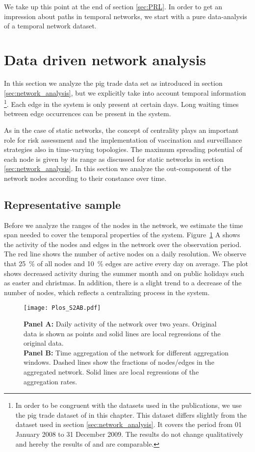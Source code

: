 We take up this point at the end of section \ref{sec:PRL}.
In order to get an impression about paths in temporal networks, we start with a pure data-analysis of a temporal network dataset. 



\section{Data driven network analysis}\label{sec:Plos}
In this section we analyze the pig trade data set as introduced in section \ref{sec:network_analysis}, but we explicitly take into account temporal information%
\footnote{%
In order to be congruent with the datasets used in the publications, we use the pig trade dataset of \citep{Konschake:2013js} in this chapter.
This dataset differs slightly from the dataset used in section \ref{sec:network_analysis}.
It covers the period from 01 January 2008 to 31 December 2009.
The results do not change qualitatively and hereby the results of \citep{Konschake:2013js} and \citep{Lentz:2013PRL} are comparable.}. %
Each edge in the system is only present at certain days.
Long waiting times between edge occurrences can be present in the system.

As in the case of static networks, the concept of centrality plays an important role for risk assessment and the implementation of vaccination and surveillance strategies also in time-varying topologies.
The maximum spreading potential of each node is given by its range as discussed for static networks in section \ref{sec:network_analysis}.
In this section we analyze the out-component of the network nodes according to their constance over time.

\subsection{Representative sample}\label{sec:representative_sample}
Before we analyze the ranges of the nodes in the network, we estimate the time span needed to cover the temporal properties of the system.
Figure~\ref{fig:Plos_S1} A shows the activity of the nodes and edges in the network over the observation period.
The red line shows the number of active nodes on a daily resolution.
We observe that 25~\% of all nodes and 10~\% edges are active every day on average.
The plot shows decreased activity during the summer month and on public holidays such as easter and christmas.
In addition, there is a slight trend to a decrease of the number of nodes, which reflects a centralizing process in the system.
%
\begin{figure}[htbp]
\begin{center}
\texttt{[image: Plos\_S2AB.pdf]}
\caption{\textbf{Panel A:} Daily activity of the network over two years.
Original data is shown as points and solid lines are local regressions of the original data.\\
\textbf{Panel B:} Time aggregation of the network for different aggregation windows.
Dashed lines show the fractions of nodes/edges in the aggregated network.
Solid lines are local regressions of the aggregation rates.
}
\label{fig:Plos_S1}
\end{center}
\end{figure}

